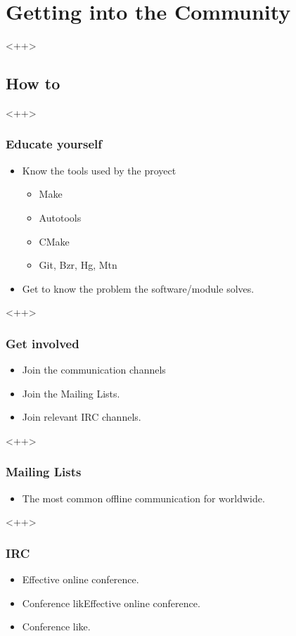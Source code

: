 \documentclass[hyperref={pdfpagelabels=false},xcolor=pst,pdf,fragile]{beamer}
\begin{document}
\section{Getting into the Community}<++>

\subsection{How to}<++>

\begin{frame}
  \frametitle{Educate yourself}

  \begin{itemize}
	\item Know the tools used by the proyect
	  \begin{itemize}
		\item Make
		\item Autotools
		\item CMake
		\item Git, Bzr, Hg, Mtn
	  \end{itemize}
	\item Get to know the problem the software/module solves.
  \end{itemize}<++>

\end{frame}

\begin{frame}
  \frametitle{Get involved}

  \begin{itemize}
	\item Join the communication channels
	\item Join the Mailing Lists.
	\item Join relevant IRC channels.
  \end{itemize}<++>

\end{frame}

\begin{frame}
  \frametitle{Mailing Lists}

  \begin{itemize}
	\item The most common offline communication for worldwide.
  \end{itemize}<++>

\end{frame}

\begin{frame}
  \frametitle{IRC}

  \begin{itemize}
	\item Effective online conference.
	\item Conference likEffective online conference.
	\item Conference like.
  \end{itemize}

\end{frame}
\end{document}
